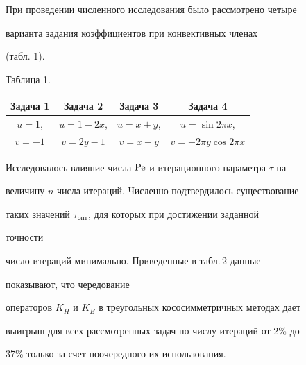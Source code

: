  


При проведении численного исследования было рассмотрено четыре 


варианта задания коэффициентов при конвективных членах  


(табл. 1). 


\smallskip 


 


\hspace{10.5cm} Таблица 1. 


\begin{center}


\begin{tabular}{|c|c|c|c|} 


\hline 


Задача 1 & Задача 2 & Задача 3 & Задача 4 \\ 


\hline 


$u=1$, & $u=1-2x$, & $u=x+y$, & $u=\sin 2\pi x$, \\ 


$v=-1$ & $v=2y-1$ & $v=x-y$ & $v=-2\pi y\cos 2\pi x$\\ 


\hline 


\end{tabular} 


\end{center}


\smallskip


 


Исследовалось влияние числа $\operatorname{Pe}$ и итерационного параметра $\tau$ на  


величину $n$ числа итераций. Численно подтвердилось существование  


таких значений $\tau_{\text{опт}}$, для которых при достижении заданной 


точности 


число итераций минимально. Приведенные в табл.\,2 данные


показывают, что чередование 


операторов $K_H$ и $K_B$ в треугольных кососимметричных методах дает  


выигрыш для всех рассмотренных задач по числу итераций от 2\% до  


37\% только за счет поочередного их использования. 





\smallskip 


